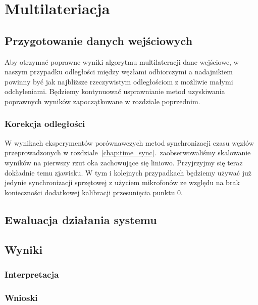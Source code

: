 \chapter{Multilateriacja}\label{chap:multilateration}

\section{Przygotowanie danych wejściowych}

Aby otrzymać poprawne wyniki algorytmu multilateracji dane wejściowe, w naszym przypadku odległości między węzłami odbiorczymi a nadajnikiem powinny być jak najbliższe rzeczywistym odległościom z możliwie małymi odchyleniami. Będziemy kontynuować usprawnianie metod uzyskiwania poprawnych wyników zapoczątkowane w rozdziale poprzednim.

\subsection{Korekcja odległości}

W wynikach eksperymentów porównawczych metod synchronizacji czasu węzłów przeprowadzonych w rozdziale~\ref{chap:time_sync}.\ zaobserwowaliśmy skalowanie wyników na pierwszy rzut oka zachowujące się liniowo. Przyjrzyjmy się teraz dokładnie temu zjawisku. W tym i kolejnych przypadkach będziemy używać już jedynie synchronizacji sprzętowej z użyciem mikrofonów ze względu na brak konieczności dodatkowej kalibracji przesunięcia punktu 0.

\section{Ewaluacja działania systemu}

\section{Wyniki}

\subsection{Interpretacja}

\subsection{Wnioski}
